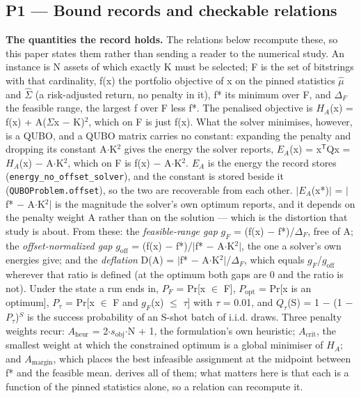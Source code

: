 \documentclass[acmsmall,screen,review]{acmart}
\begin{document}
\subsection{P1 --- Bound records and checkable relations}

\textbf{The quantities the record holds.} The relations below recompute these, so this paper states them rather than sending a reader to the numerical study. An instance is N assets of which exactly K must be selected; F is the set of bitstrings with that cardinality, f(x) the portfolio objective of x on the pinned statistics $\hat{\mu}$ and $\hat{\Sigma}$ (a risk-adjusted return, no penalty in it), f* its minimum over F, and $\Delta_{F}$ the feasible range, the largest f over F less f*. The penalised objective is $H_{A}$(x) = f(x) + A($\Sigma$x $-$ K)$^{2}$, which on F is just f(x). What the solver minimises, however, is a QUBO, and a QUBO matrix carries no constant: expanding the penalty and dropping its constant A$\cdot$K$^{2}$ gives the energy the solver reports, $E_{A}$(x) = x$^{\mathsf{T}}$Qx = $H_{A}$(x) $-$ A$\cdot$K$^{2}$, which on F is f(x) $-$ A$\cdot$K$^{2}$. $E_{A}$ is the energy the record stores (\texttt{energy\_\allowbreak{}no\_\allowbreak{}offset\_\allowbreak{}solver}), and the constant is stored beside it (\texttt{QUBOProblem.\allowbreak{}offset}), so the two are recoverable from each other. $|$$E_{A}$(x*)$|$ = $|$f* $-$ A$\cdot$K$^{2}$$|$ is the magnitude the solver's own optimum reports, and it depends on the penalty weight A rather than on the solution --- which is the distortion that study is about. From these: the \textit{feasible-range gap} $g_{F}$ = (f(x) $-$ f*)/$\Delta_{F}$, free of A; the \textit{offset-normalized gap} $g_{\mathrm{off}}$ = (f(x) $-$ f*)/$|$f* $-$ A$\cdot$K$^{2}$$|$, the one a solver's own energies give; and the \textit{deflation} D(A) = $|$f* $-$ A$\cdot$K$^{2}$$|$/$\Delta_{F}$, which equals $g_{F}$/$g_{\mathrm{off}}$ wherever that ratio is defined (at the optimum both gaps are 0 and the ratio is not). Under the state a run ends in, $P_{F}$ = Pr[x $\in$ F], $P_{\mathrm{opt}}$ = Pr[x is an optimum], $P_{\tau}$ = Pr[x $\in$ F and $g_{F}$(x) $\leq$ $\tau$] with $\tau$ = 0.01, and $Q_{\tau}$(S) = 1 $-$ (1 $-$ $P_{\tau}$)$^{S}$ is the success probability of an S-shot batch of i.i.d. draws. Three penalty weights recur: $A_{\mathrm{heur}}$ = 2$\cdot$$s_{\mathrm{obj}}$$\cdot$N + 1, the formulation's own heuristic; $A_{\mathrm{crit}}$, the smallest weight at which the constrained optimum is a global minimiser of $H_{A}$; and $A_{\mathrm{margin}}$, which places the best infeasible assignment at the midpoint between f* and the feasible mean. \cite{ref1} derives all of them; what matters here is that each is a function of the pinned statistics alone, so a relation can recompute it.
\end{document}

